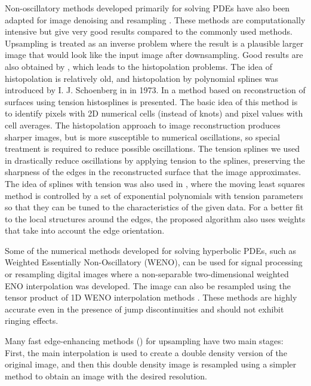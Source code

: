 Non-oscillatory methods developed primarily for solving PDEs have also been adapted for image denoising and resampling \cite{ImageZooming,Strong2000edge,Youngjoon2014,HakranKim2011}. These methods are computationally intensive but give very good results compared to the commonly used methods. Upsampling is treated as an inverse problem where the result is a plausible larger image that would look like the input image after downsampling. Good results are also obtained by \cite{Robidoux2008}, which leads to the histopolation problems.
The idea of histopolation is relatively old, and histopolation by polynomial splines was introduced by I. J. Schoenberg in \cite{schoenberghisto} in 1973. In \cite{bosnercrnkovicskifictension} a method based on reconstruction of surfaces using tension histosplines is presented. The basic idea of this method is to identify pixels with 2D numerical cells (instead of knots) and pixel values with cell averages. The histopolation approach to image reconstruction produces sharper images, but is more susceptible to numerical oscillations, so special treatment is required to reduce possible oscillations.
The tension splines we used in \cite{bosnercrnkovicskifictension} drastically reduce oscillations by applying tension to the splines, preserving the sharpness of the edges in the reconstructed surface that the image approximates.
The idea of splines with tension was also used in \cite{Yeon2015}, where the moving least squares method is controlled by a set of exponential polynomials with tension parameters so that they can be tuned to the characteristics of the given data. For a better fit to the local structures around the edges, the proposed algorithm also uses weights that take into account the edge orientation.

Some of %
the numerical methods developed for solving hyperbolic PDEs, such as  Weighted Essentially Non-Oscillatory (WENO), can be used for signal processing \cite{AMAT2021}  or resampling digital images \cite{ARANDIGA2012} where a non-separable two-dimensional weighted ENO interpolation was developed. The image can also be resampled using the tensor product of 1D WENO interpolation methods \cite{Mulet_2010}. These methods are highly accurate even in the presence of jump discontinuities and should not exhibit ringing effects. 

Many fast edge-enhancing methods (\cite{LocallyAdaptiveZooming,WenoZooming,Robidoux2009,Tian2012Edge}) for upsampling have two main stages: First, the main interpolation is used to create a double density version of the original image, and then this double density image is resampled using a simpler method to obtain an image with the desired resolution.

